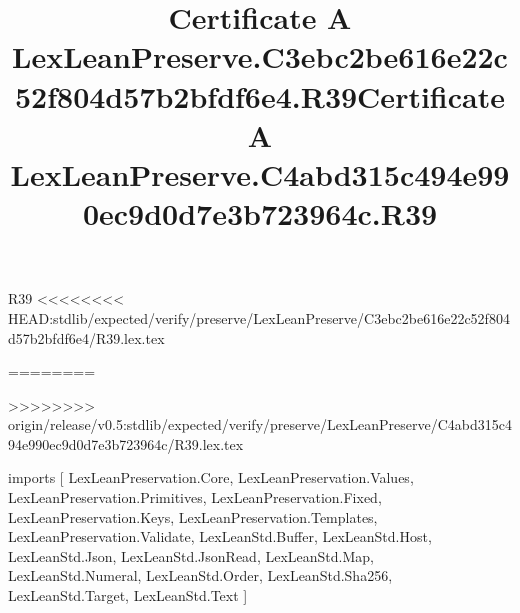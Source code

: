 \begin{lexlean}{R39}
<<<<<<<< HEAD:stdlib/expected/verify/preserve/LexLeanPreserve/C3ebc2be616e22c52f804d57b2bfdf6e4/R39.lex.tex
\title{Certificate A LexLeanPreserve.C3ebc2be616e22c52f804d57b2bfdf6e4.R39}
========
\title{Certificate A LexLeanPreserve.C4abd315c494e990ec9d0d7e3b723964c.R39}
>>>>>>>> origin/release/v0.5:stdlib/expected/verify/preserve/LexLeanPreserve/C4abd315c494e990ec9d0d7e3b723964c/R39.lex.tex
\begin{coremodule}
imports [
  LexLeanPreservation.Core,
  LexLeanPreservation.Values,
  LexLeanPreservation.Primitives,
  LexLeanPreservation.Fixed,
  LexLeanPreservation.Keys,
  LexLeanPreservation.Templates,
  LexLeanPreservation.Validate,
  LexLeanStd.Buffer,
  LexLeanStd.Host,
  LexLeanStd.Json,
  LexLeanStd.JsonRead,
  LexLeanStd.Map,
  LexLeanStd.Numeral,
  LexLeanStd.Order,
  LexLeanStd.Sha256,
  LexLeanStd.Target,
  LexLeanStd.Text
]


\end{coremodule}
\end{lexlean}
